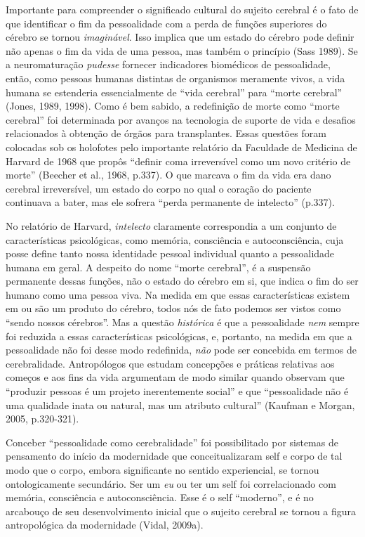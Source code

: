 Importante para compreender o significado cultural do sujeito cerebral é
o fato de que identificar o fim da pessoalidade com a perda de funções
superiores do cérebro se tornou \emph{imaginável}. Isso implica que um
estado do cérebro pode definir não apenas o fim da vida de uma pessoa,
mas também o princípio (Sass 1989). Se a neuromaturação \emph{pudesse}
fornecer indicadores biomédicos de pessoalidade, então, como pessoas
humanas distintas de organismos meramente vivos, a vida humana se
estenderia essencialmente de ``vida cerebral'' para ``morte cerebral''
(Jones, 1989, 1998). Como é bem sabido, a redefinição de morte como
``morte cerebral'' foi determinada por avanços na tecnologia de suporte
de vida e desafios relacionados à obtenção de órgãos para transplantes.
Essas questões foram colocadas sob os holofotes pelo importante
relatório da Faculdade de Medicina de Harvard de 1968 que propôs
``definir coma irreversível como um novo critério de morte'' (Beecher et
al., 1968, p.337). O que marcava o fim da vida era dano cerebral
irreversível, um estado do corpo no qual o coração do paciente
continuava a bater, mas ele sofrera ``perda permanente de intelecto''
(p.337).

No relatório de Harvard, \emph{intelecto} claramente correspondia a um
conjunto de características psicológicas, como memória, consciência e
autoconsciência, cuja posse define tanto nossa identidade pessoal
individual quanto a pessoalidade humana em geral. A despeito do nome
``morte cerebral'', é a suspensão permanente dessas funções, não o
estado do cérebro em si, que indica o fim do ser humano como uma pessoa
viva. Na medida em que essas características existem em ou são um
produto do cérebro, todos nós de fato podemos ser vistos como ``sendo
nossos cérebros''. Mas a questão \emph{histórica} é que a pessoalidade
\emph{nem} sempre foi reduzida a essas características psicológicas, e,
portanto, na medida em que a pessoalidade não foi desse modo redefinida,
\emph{não} pode ser concebida em termos de cerebralidade. Antropólogos
que estudam concepções e práticas relativas aos começos e aos fins da
vida argumentam de modo similar quando observam que ``produzir pessoas é
um projeto inerentemente social'' e que ``pessoalidade não é uma
qualidade inata ou natural, mas um atributo cultural'' (Kaufman e
Morgan, 2005, p.320-321).

Conceber ``pessoalidade como cerebralidade'' foi possibilitado por
sistemas de pensamento do início da modernidade que conceitualizaram
self e corpo de tal modo que o corpo, embora significante no sentido
experiencial, se tornou ontologicamente secundário. Ser um \emph{eu} ou
ter um self foi correlacionado com memória, consciência e
autoconsciência. Esse é o self ``moderno'', e é no arcabouço de seu
desenvolvimento inicial que o sujeito cerebral se tornou a figura
antropológica da modernidade (Vidal, 2009a).

